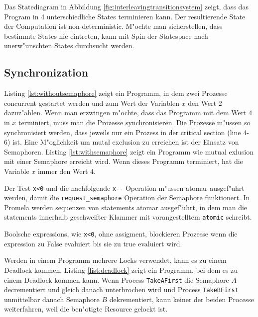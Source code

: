 \documentclass[11pt,twoside,a4paper]{article}
\begin{document}
Das Statediagram in Abbildung \ref{fig:interleavingtransitionsystem} zeigt, dass das Program in 4 unterschiedliche States terminieren kann. Der resultierende State der Computation ist non-deterministic. M"ochte man sicherstellen, dass bestimmte States nie eintreten, kann mit Spin der Statespace nach unerw"unschten States durchsucht werden.

\subsection{Synchronization}
\label{sec:synchronization}

Listing \ref{lst:withoutsemaphore} zeigt ein Programm, in dem zwei Prozesse concurrent gestartet werden und zum Wert der Variablen $x$ den Wert $2$ dazuz"ahlen. Wenn man erzwingen m"ochte, dass das Programm mit dem Wert $4$ in $x$ terminiert, muss man die Prozesse synchronisieren. Die Prozesse m"ussen so synchronisiert werden, dass jeweils nur ein Prozess in der critical section (line 4-6) ist. Eine M"oglichkeit um mutal exclusion zu erreichen ist der Einsatz von Semaphoren. Listing \ref{lst:withsemaphore} zeigt ein Programm wie mutual exlusion mit einer Semaphore erreicht wird. Wenn dieses Programm terminiert, hat die Variable $x$ immer den Wert $4$.



Der Test \verb|x<0| und die nachfolgende \verb|x--| Operation m"ussen atomar ausgef"uhrt werden, damit die \verb|request_semaphore| Operation der Semaphore funktionert. In Promela werden sequenzen von statements atomar ausgef"uhrt, in dem man die statements innerhalb geschweifter Klammer mit vorangestelltem \verb|atomic| schreibt.

Boolsche expressions, wie \verb|x<0|, ohne assigment, blockieren Prozesse wenn die expression zu False evaluiert bis sie zu true evaluiert wird.



Werden in einem Programm mehrere Locks verwendet, kann es zu einem Deadlock kommen. Listing \ref{list:deadlock} zeigt ein Programm, bei dem es zu einem Deadlock kommen kann. Wenn Process \verbTakeAFirst die Semaphore $A$ decrementiert und gleich danach unterbrochen wird und Process \verbTakeBFirst unmittelbar danach Semaphore $B$ dekrementiert, kann keiner der beiden Processe weiterfahren, weil die ben"otigte Resource gelockt ist.
\end{document}
